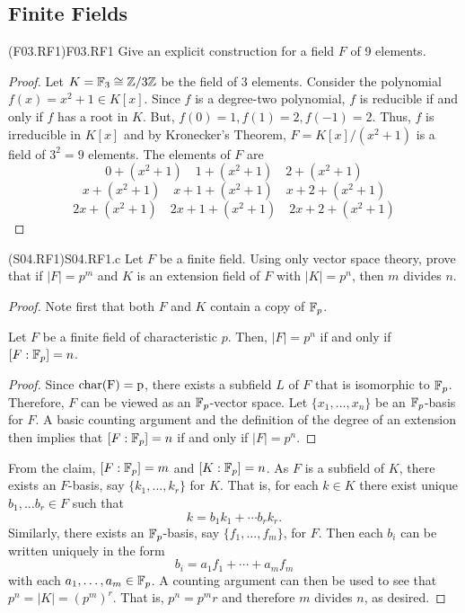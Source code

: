 \documentclass[../../AlgebraQualSolutions.tex]{subfiles}
\begin{document}
\subsection{Finite Fields}

\begin{prob}{(F03.RF1)}{F03.RF1}
Give an explicit construction for a field $F$ of 9 elements.
\end{prob}
\begin{proof}
	Let $K = \mathbb{F}_3 \cong \mathbb{Z}/3\mathbb{Z}$ be the field of 3 elements. Consider the polynomial $f(x) = x^2 + 1 \in K[x]$. Since $f$ is a degree-two polynomial, $f$ is reducible if and only if $f$ has a root in $K$. But, $f(0) = 1, f(1) = 2, f(-1) = 2$. Thus, $f$ is irreducible in $K[x]$ and by Kronecker's Theorem, $F = K[x]/(x^2 + 1)$ is a field of $3^2 = 9$ elements. The elements of $F$ are
		\[0 + (x^2 + 1) \quad 1 + (x^2 + 1) \quad 2 + (x^2 + 1)\]
		\[x + (x^2 + 1) \quad x + 1 + (x^2 + 1) \quad x + 2 + (x^2 + 1)\]
		\[2x + (x^2 + 1) \quad 2x + 1 + (x^2 + 1) \quad 2x + 2 + (x^2 + 1)\]
\end{proof}

\begin{prob}{(S04.RF1)}{S04.RF1.c}
	Let $F$ be a finite field. Using only vector space theory, prove that if $|F| = p^m$ and $K$ is an extension field  of $F$ with $|K|=p^n$, then $m$ divides $n$.
\end{prob}

\begin{proof}
	Note first that both $F$ and $K$ contain a copy of $\mathbb{F}_p$.
		\begin{claim}
			Let $F$ be a finite field of characteristic $p$. Then, $|F|=p^n$ if and only if $[F:\mathbb{F}_p] = n$.

			\begin{proof}
				Since $\rm{char}(F) = p$, there exists a subfield $L$ of $F$ that is isomorphic to $\mathbb{F}_p$. Therefore, $F$ can be viewed as an $\mathbb{F}_p$-vector space. Let $\{x_1,\ldots, x_n\}$ be an $\mathbb{F}_p$-basis for $F$. A basic counting argument and the definition of the degree of an extension then implies that $[F:\mathbb{F}_p] = n$ if and only if $|F|=p^n$.
			\end{proof}
		\end{claim}

	From the claim, $[F:\mathbb{F}_p] = m$ and $[K:\mathbb{F}_p] = n$. As $F$ is a subfield of $K$, there exists an $F$-basis, say $\{k_1, \ldots, k_r\}$ for $K$. That is, for each $k \in K$ there exist unique $b_1,\ldots b_r \in F$ such that
		\[k = b_1k_1 + \cdots b_rk_r.\]
	Similarly, there exists an $\mathbb{F}_p$-basis, say $\{f_1,\ldots, f_m\}$, for $F$. Then each $b_i$ can be written uniquely in the form 	
		\[b_i = a_1f_1 + \cdots + a_mf_m\]
	with each $a_1,\ldots,a_m \in \mathbb{F}_p$. A counting argument can then be used to see that $p^n = |K| = \left(p^m\right)^r$. That is, $p^n = p^mr$ and therefore $m$ divides $n$, as desired.
\end{proof}
\end{document}
